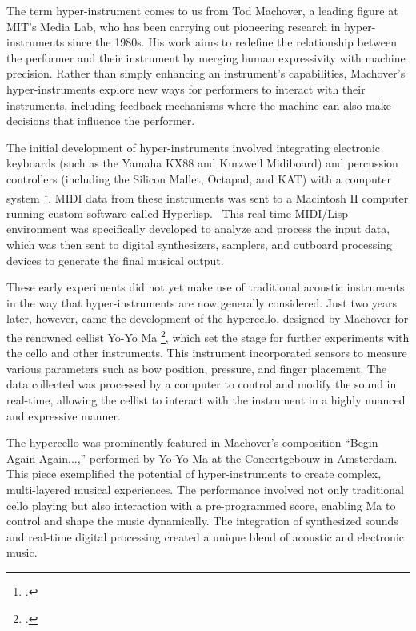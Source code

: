 \documentclass[12pt,twoside,maitrise]{dms_ks}
\theoremstyle{definition}
\begin{document}
{{The term hyper-instrument comes to us from Tod Machover, a leading figure at MIT's Media Lab, who has been carrying out pioneering research in hyper-instruments since the 1980s. 
His work aims to redefine the relationship between the performer and their instrument by merging human expressivity with machine precision. 
Rather than simply enhancing an instrument's capabilities, Machover's hyper-instruments explore new ways for performers to interact with their instruments, including feedback mechanisms where the machine can also make decisions that influence the performer.

The initial development of hyper-instruments involved integrating electronic keyboards (such as the Yamaha KX88 and Kurzweil Midiboard) and percussion controllers (including the Silicon Mallet, Octapad, and KAT) with a computer system \footcite{machover_hyper-instruments_1989}. 
MIDI data from these instruments was sent to a Macintosh II computer running custom software called Hyperlisp.~
This real-time MIDI/Lisp environment was specifically developed to analyze and process the input data, which was then sent to digital synthesizers, samplers, and outboard processing devices to generate the final musical output.

These early experiments did not yet make use of traditional acoustic instruments in the way that hyper-instruments are now generally considered. Just two years later, however, came the development of the hypercello, designed by Machover for the renowned cellist Yo-Yo Ma \footcite{levenson_taming_1994}, which set the stage for further experiments with the cello and other instruments. 
This instrument incorporated sensors to measure various parameters such as bow position, pressure, and finger placement. 
The data collected was processed by a computer to control and modify the sound in real-time, allowing the cellist to interact with the instrument in a highly nuanced and expressive manner.

The hypercello was prominently featured in Machover's composition “Begin Again Again...,” performed by Yo-Yo Ma at the Concertgebouw in Amsterdam. 
This piece exemplified the potential of hyper-instruments to create complex, multi-layered musical experiences. 
The performance involved not only traditional cello playing but also interaction with a pre-programmed score, enabling Ma to control and shape the music dynamically. 
The integration of synthesized sounds and real-time digital processing created a unique blend of acoustic and electronic music.

}}
\end{document}

